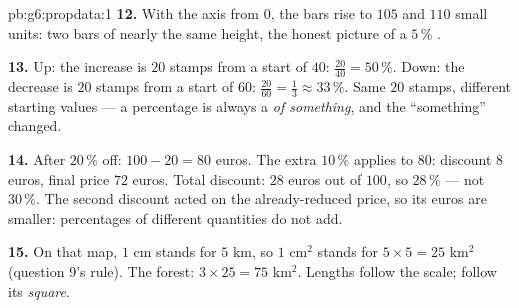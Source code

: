 \begin{solution}{pb:g6:propdata:1}
\textbf{12.} With the axis from $0$, the bars rise to $105$ and
$110$ small units: two bars of nearly the same height, the
honest picture of a $5\,\%$ .

\textbf{13.} Up: the increase is $20$ stamps from a start of
$40$: $\frac{20}{40} = 50\,\%$. Down: the decrease is $20$
stamps from a start of $60$: $\frac{20}{60} = \frac13 \approx
33\,\%$. Same $20$ stamps, different starting values --- a
percentage is always a  \emph{of something}, and the
``something'' changed.

\textbf{14.} After $20\,\%$ off: $100 - 20 = 80$ euros. The
extra $10\,\%$ applies to $80$: discount $8$ euros, final price
$72$ euros. Total discount: $28$ euros out of $100$, so
$28\,\%$ --- not $30\,\%$. The second discount acted on the
already-reduced price, so its euros are smaller: percentages of
different quantities do not add.

\textbf{15.} On that map, $1$ cm stands for $5$ km, so $1$
cm$^2$ stands for $5 \times 5 = 25$ km$^2$ (question 9's rule).
The forest: $3 \times 25 = 75$ km$^2$. Lengths follow the
scale;  follow its \emph{square}.
\end{solution}
